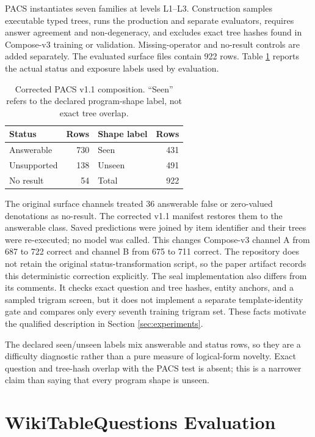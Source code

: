 PACS instantiates seven families at levels L1--L3.  Construction samples executable typed trees,
runs the production and separate evaluators, requires answer agreement and non-degeneracy, and
excludes exact tree hashes found in Compose-v3 training or validation.  Missing-operator and
no-result controls are added separately.  The evaluated surface files contain 922 rows.  Table
\ref{tab:pacs-composition} reports the actual status and exposure labels used by evaluation.

\begin{table}[h]
  \centering
  \caption{Corrected PACS v1.1 composition.  ``Seen'' refers to the declared program-shape label,
  not exact tree overlap.}
  \label{tab:pacs-composition}
  \small
  \begin{tabular}{lr@{\hskip 3em}lr}
    \toprule
    Status & Rows & Shape label & Rows \\
    \midrule
    Answerable & 730 & Seen & 431 \\
    Unsupported & 138 & Unseen & 491 \\
    No result & 54 & Total & 922 \\
    \bottomrule
  \end{tabular}
\end{table}

The original surface channels treated 36 answerable false or zero-valued denotations as no-result.
The corrected v1.1 manifest restores them to the answerable class.  Saved predictions were joined
by item identifier and their trees were re-executed; no model was called.  This changes Compose-v3
channel A from 687 to 722 correct and channel B from 675 to 711 correct.  The repository does not
retain the original status-transformation script, so the paper artifact records this deterministic
correction explicitly.  The seal implementation also differs from its comments.  It checks exact
question and tree hashes, entity anchors, and a sampled trigram screen, but it does not implement a
separate template-identity gate and compares only every seventh training trigram set.  These facts
motivate the qualified description in Section \ref{sec:experiments}.

The declared seen/unseen labels mix answerable and status rows, so they are a difficulty diagnostic
rather than a pure measure of logical-form novelty.  Exact question and tree-hash overlap with the
PACS test is absent; this is a narrower claim than saying that every program shape is unseen.

\section{WikiTableQuestions Evaluation}
\label{app:wtq}

